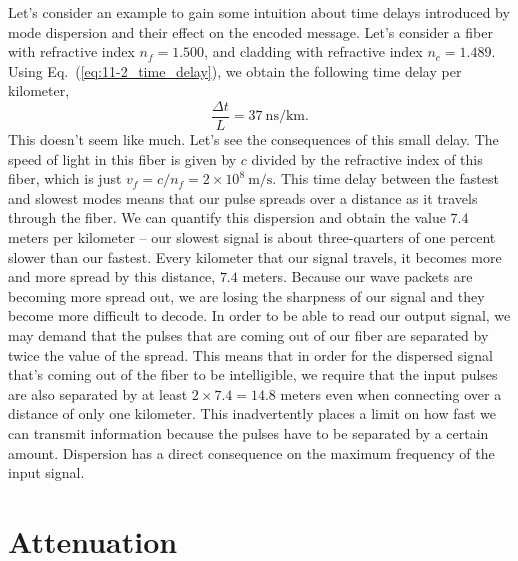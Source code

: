 Let's consider an example to gain some intuition about time delays introduced by mode dispersion and their effect on the encoded message.
Let's consider a fiber with refractive index $n_f = 1.500$, and cladding with refractive index $n_c = 1.489$.
Using Eq.~(\ref{eq:11-2_time_delay}), we obtain the following time delay per kilometer,
\begin{equation}
    \frac{\Delta t}{L}=37 \mathrm{~ns} / \mathrm{km}.
\end{equation}
This doesn't seem like much.
Let's see the consequences of this small delay.
The speed of light in this fiber is given by $c$ divided by the refractive index of this fiber, which is just $v_f=c / n_f=2 \times 10^8 \mathrm{~m} / \mathrm{s}$.
This time delay between the fastest and slowest modes means that our pulse spreads over a distance as it travels through the fiber. We can quantify this dispersion and obtain the value $7.4$ meters per kilometer -- our slowest signal is about three-quarters of one percent slower than our fastest. Every kilometer that our signal travels, it becomes more and more spread by this distance, $7.4$ meters.
Because our wave packets are becoming more spread out, we are losing the sharpness of our signal and they become more difficult to decode. In order to be able to read our output signal, we may demand that the pulses that are coming out of our fiber are separated by twice the value of the spread.
This means that in order for the dispersed signal that's coming out of the fiber to be intelligible, we require that the input pulses are also separated by at least $2\times 7.4 = 14.8$ meters even when connecting over a distance of only one kilometer. This inadvertently places a limit on how fast we can transmit information because the pulses have to be separated by a certain amount.
Dispersion has a direct consequence on the maximum frequency of the input signal.



\section{Attenuation}
\label{sec:11-3_attenuation}

